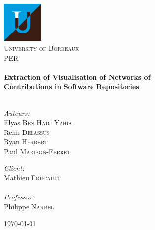 \begin{titlepage}
\begin{center}

\includegraphics[width=0.15\textwidth]{./resources/ub.png}~\\[1cm]

\textsc{\LARGE University of Bordeaux}\\[1.5cm]

\textsc{\Large {PER}}\\[0.5cm]

\HRule \\[0.4cm]
{ \huge \bfseries Extraction of Visualisation of Networks of \\Contributions in Software Repositories}\\[0.4cm]

\HRule \\[1.5cm]

\begin{minipage}{0.4\textwidth}
\begin{flushleft} \large
\emph{Auteurs:} \\
Elyas \textsc{Ben Hadj Yahia}\\
Remi \textsc{Delassus}\\
Ryan \textsc{Herbert}\\
Paul \textsc{Maribon-Ferret}\\
\end{flushleft}
\end{minipage}
\begin{minipage}{0.4\textwidth}
\begin{flushright} \large
\emph{Client:} \\
Mathieu \textsc{Foucault}\\
\emph{\\Professor:} \\
Philippe \textsc{Narbel}
\end{flushright}
\end{minipage}

\vfill

{\large \today}

\end{center}
\end{titlepage}
